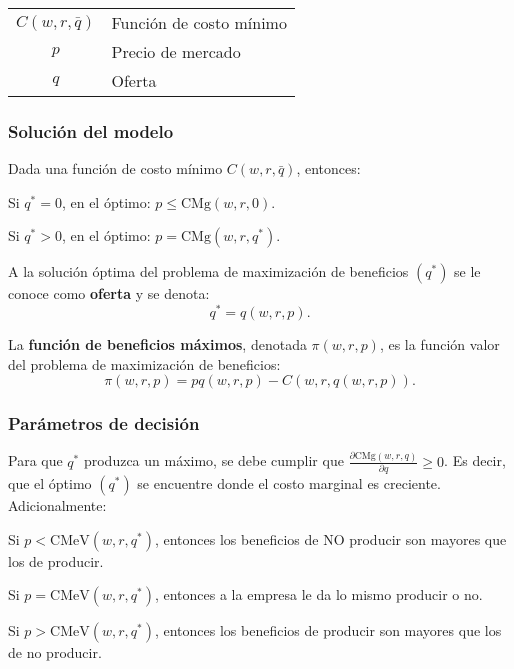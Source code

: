 \documentclass[8pt,a4paper]{extarticle}
\begin{document}
\begin{multicols}{3}
\begin{center}
\begin{tabular}{ c l }
    \hline
	$C(w, r, \bar{q})$ & Función de costo mínimo \\
    $p$ & Precio de mercado \\
    $q$ & Oferta \\
    \hline
\end{tabular}
\end{center}

\subsubsection*{Solución del modelo}

Dada una función de costo mínimo $C (w, r, \bar{q})$, entonces:

\begin{bulletlist}
\item Si $q^* = 0$, en el óptimo: $p \le \text{CMg} (w, r, 0)$.
\item Si $q^* > 0$, en el óptimo: $p = \text{CMg} (w, r, q^*)$.
\end{bulletlist}

\begin{boxdef}[Oferta]
	A la solución óptima del problema de maximización de beneficios $(q^*)$ se le conoce como \textbf{oferta} y se denota:
	\[
		q^* = q(w, r, p)
	.\] 
\end{boxdef}

\begin{boxdef}
	La \textbf{función de beneficios máximos}, denotada $\pi(w, r, p)$, es la función valor del problema de maximización de beneficios:
	\[
		\pi (w, r, p) = pq(w, r, p) - C (w, r, q(w, r, p))
	.\] 
\end{boxdef}

\subsubsection*{Parámetros de decisión}

Para que $q^*$ produzca un máximo, se debe cumplir que $\displaystyle \frac{\partial \text{CMg} (w, r, q)}{\partial q} \ge 0$. Es decir, que el óptimo $(q^*)$ se encuentre donde el costo marginal es creciente. Adicionalmente:

\begin{eqlist}
\item Si $p < \text{CMeV} (w, r, q^*)$, entonces los beneficios de NO producir son mayores que los de producir.
\item Si $p = \text{CMeV} (w, r, q^*)$, entonces a la empresa le da lo mismo producir o no.
\item Si $p > \text{CMeV} (w, r, q^*)$, entonces los beneficios de producir son mayores que los de no producir.
\end{eqlist}


\end{multicols}
\end{document}
